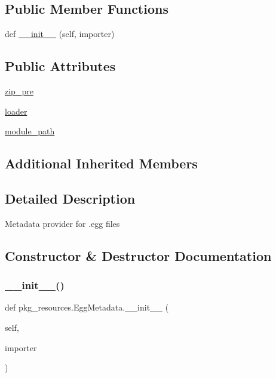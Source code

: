 \subsection*{Public Member Functions}
\begin{DoxyCompactItemize}
\item 
def \hyperlink{classpkg__resources_1_1EggMetadata_a389d7931032f53576de67963be4ec790}{\+\_\+\+\_\+init\+\_\+\+\_\+} (self, importer)
\end{DoxyCompactItemize}
\subsection*{Public Attributes}
\begin{DoxyCompactItemize}
\item 
\hyperlink{classpkg__resources_1_1EggMetadata_a5a1e0bd2d5340e574b3b532e8f21d363}{zip\+\_\+pre}
\item 
\hyperlink{classpkg__resources_1_1EggMetadata_abc7936ead6a706047cb2d52bf800557c}{loader}
\item 
\hyperlink{classpkg__resources_1_1EggMetadata_a41391e3d836916141fa95197550b1937}{module\+\_\+path}
\end{DoxyCompactItemize}
\subsection*{Additional Inherited Members}


\subsection{Detailed Description}
\begin{DoxyVerb}Metadata provider for .egg files\end{DoxyVerb}
 

\subsection{Constructor \& Destructor Documentation}
\mbox{\label{classpkg__resources_1_1EggMetadata_a389d7931032f53576de67963be4ec790}} 
\subsubsection{\texorpdfstring{\+\_\+\+\_\+init\+\_\+\+\_\+()}{\_\_init\_\_()}}
{\footnotesize\ttfamily def pkg\+\_\+resources.\+Egg\+Metadata.\+\_\+\+\_\+init\+\_\+\+\_\+ (\begin{DoxyParamCaption}\item[{}]{self,  }\item[{}]{importer }\end{DoxyParamCaption})}

